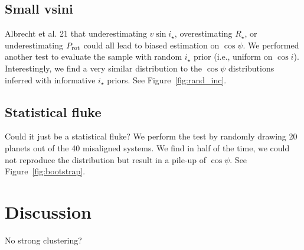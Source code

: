 \documentclass[twocolumn,times]{aastex631}
\begin{document}

\subsection{Small vsini}
Albrecht et al. 21 that underestimating $v\sin{i_\star}$, overestimating $R_\star$, or underestimating $P_{\rm rot}$ could all lead to biased estimation on $\cos{\psi}$. We performed another test to evaluate the sample with random $i_\star$ prior (i.e., uniform on $\cos{i}$). Interestingly, we find a very similar distribution to the $\cos{\psi}$ distributions inferred with informative $i_\star$ priors. See Figure~\ref{fig:rand_inc}.


\subsection{Statistical fluke}
Could it just be a statistical fluke? We perform the test by randomly drawing 20 planets out of the 40 misaligned systems. We find in half of the time, we could not reproduce the distribution but result in a pile-up of $\cos{\psi}$. See Figure~\ref{fig:bootstrap}.


\section{Discussion}
No strong clustering?


\end{document}
